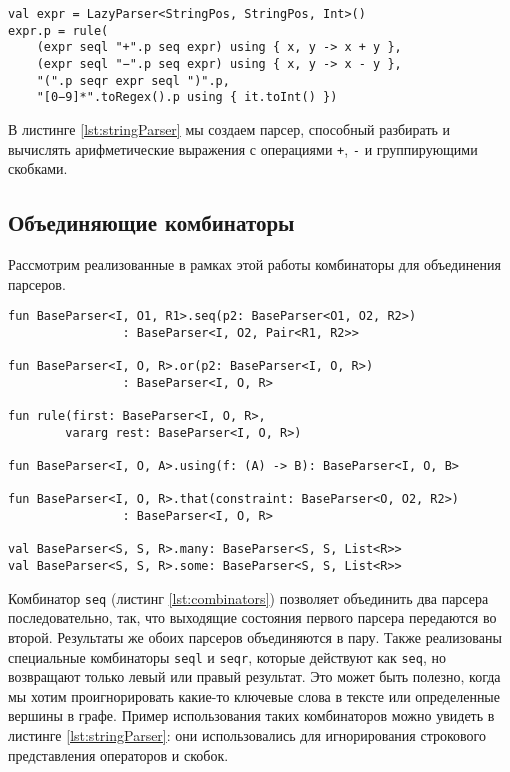\begin{lstlisting}[float=ht, label=lst:stringParser, caption=Пример строкового парсера]
val expr = LazyParser<StringPos, StringPos, Int>()
expr.p = rule(
    (expr seql "+".p seq expr) using { x, y -> x + y },
    (expr seql "−".p seq expr) using { x, y -> x - y },
    "(".p seqr expr seql ")".p,
    "[0−9]*".toRegex().p using { it.toInt() })
\end{lstlisting}

В листинге \ref{lst:stringParser} мы создаем парсер, способный разбирать и вычислять арифметические выражения с операциями \verb|+|, \verb|-| и группирующими скобками.


\subsection{Объединяющие комбинаторы}

Рассмотрим реализованные в рамках этой работы комбинаторы для объединения парсеров.

\begin{lstlisting}[float=ht, label=lst:combinators, caption=Объединяющие комбинаторы]
fun BaseParser<I, O1, R1>.seq(p2: BaseParser<O1, O2, R2>)
                : BaseParser<I, O2, Pair<R1, R2>>

fun BaseParser<I, O, R>.or(p2: BaseParser<I, O, R>)
                : BaseParser<I, O, R>

fun rule(first: BaseParser<I, O, R>, 
        vararg rest: BaseParser<I, O, R>)

fun BaseParser<I, O, A>.using(f: (A) -> B): BaseParser<I, O, B>

fun BaseParser<I, O, R>.that(constraint: BaseParser<O, O2, R2>)
                : BaseParser<I, O, R> 

val BaseParser<S, S, R>.many: BaseParser<S, S, List<R>>
val BaseParser<S, S, R>.some: BaseParser<S, S, List<R>>
\end{lstlisting}

Комбинатор \verb|seq| (листинг \ref{lst:combinators}) позволяет объединить два парсера последовательно, так, что выходящие состояния первого парсера передаются во второй.
Результаты же обоих парсеров объединяются в пару.
Также реализованы специальные комбинаторы \verb|seql| и \verb|seqr|, которые действуют как \verb|seq|, но возвращают только левый или правый результат. Это может быть полезно, когда мы хотим проигнорировать какие-то ключевые слова в тексте или определенные вершины в графе. Пример использования таких комбинаторов можно увидеть в листинге \ref{lst:stringParser}: они использовались для игнорирования строкового представления операторов и скобок.

